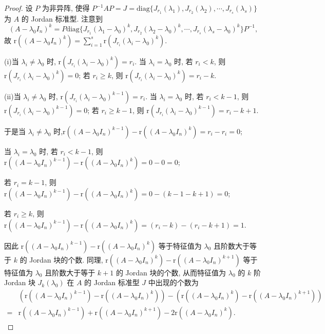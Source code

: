 \documentclass[../../main.tex]{subfiles}
\begin{document}
\begin{proof}
设 $P$ 为非异阵, 使得 $P^{-1}AP = J = \mathrm{diag}\{J_{r_1}(\lambda_1),J_{r_2}(\lambda_2),\cdots,J_{r_s}(\lambda_s)\}$ 为 $A$ 的 Jordan 标准型. 注意到
\[
(A - \lambda_0 I_n)^k = P\mathrm{diag}\{J_{r_1}(\lambda_1 - \lambda_0)^k,J_{r_2}(\lambda_2 - \lambda_0)^k,\cdots,J_{r_s}(\lambda_s - \lambda_0)^k\}P^{-1},
\]
故 $\mathrm{r}((A - \lambda_0 I_n)^k) = \sum_{i = 1}^{s}\mathrm{r}(J_{r_i}(\lambda_i - \lambda_0)^k)$.

(i)当 $\lambda_i \neq \lambda_0$ 时, $\mathrm{r}(J_{r_i}(\lambda_i - \lambda_0)^k) = r_i$. 
当 $\lambda_i = \lambda_0$ 时, 
若 $r_i < k$, 则 $\mathrm{r}(J_{r_i}(\lambda_i - \lambda_0)^k) = 0$; 
若 $r_i \geq k$, 则 $\mathrm{r}(J_{r_i}(\lambda_i - \lambda_0)^k) = r_i - k$. 

(ii)当 $\lambda_i \neq \lambda_0$ 时, $\mathrm{r}(J_{r_i}(\lambda_i - \lambda_0)^{k-1}) = r_i$. 
当 $\lambda_i = \lambda_0$ 时, 
若 $r_i < k-1$, 则 $\mathrm{r}(J_{r_i}(\lambda_i - \lambda_0)^{k-1}) = 0$; 
若 $r_i \geq k-1$, 则 $\mathrm{r}(J_{r_i}(\lambda_i - \lambda_0)^{k-1}) = r_i - k+1$. 

于是当 $\lambda_i \neq \lambda_0$ 时,$\mathrm{r}((A - \lambda_0 I_n)^{k - 1}) - \mathrm{r}((A - \lambda_0 I_n)^k)=r_i-r_i=0$;

当 $\lambda_i = \lambda_0$ 时, 
若 $r_i < k-1$, 则$\mathrm{r}((A - \lambda_0 I_n)^{k - 1}) - \mathrm{r}((A - \lambda_0 I_n)^k)=0-0=0$;

若 $r_i =k-1$, 则$\mathrm{r}((A - \lambda_0 I_n)^{k - 1}) - \mathrm{r}((A - \lambda_0 I_n)^k)=0-(k-1-k+1)=0$;

若 $r_i \geq k$, 则$\mathrm{r}((A - \lambda_0 I_n)^{k - 1}) - \mathrm{r}((A - \lambda_0 I_n)^k)=(r_i-k)-(r_i-k+1)=1$.

因此 $\mathrm{r}((A - \lambda_0 I_n)^{k - 1}) - \mathrm{r}((A - \lambda_0 I_n)^k)$ 等于特征值为 $\lambda_0$ 且阶数大于等于 $k$ 的 Jordan 块的个数. 同理, $\mathrm{r}((A - \lambda_0 I_n)^k) - \mathrm{r}((A - \lambda_0 I_n)^{k + 1})$ 等于特征值为 $\lambda_0$ 且阶数大于等于 $k + 1$ 的 Jordan 块的个数, 从而特征值为 $\lambda_0$ 的 $k$ 阶 Jordan 块 $J_k(\lambda_0)$ 在 $A$ 的 Jordan 标准型 $J$ 中出现的个数为
\begin{align*}
&(\mathrm{r}((A - \lambda_0 I_n)^{k - 1}) - \mathrm{r}((A - \lambda_0 I_n)^k)) - (\mathrm{r}((A - \lambda_0 I_n)^k) - \mathrm{r}((A - \lambda_0 I_n)^{k + 1}))\\
=&\mathrm{r}((A - \lambda_0 I_n)^{k - 1}) + \mathrm{r}((A - \lambda_0 I_n)^{k + 1}) - 2\mathrm{r}((A - \lambda_0 I_n)^k). 
\end{align*}
\end{proof}
\end{document}
